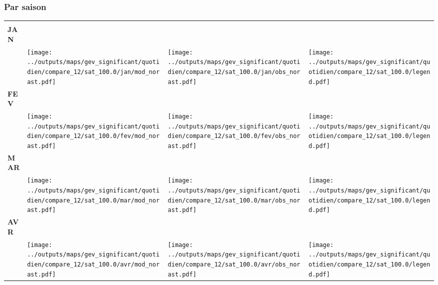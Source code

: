 \documentclass[
  letterpaper,
  DIV=11,
  numbers=noendperiod]{scrartcl}
\begin{document}
\subsubsection{Par saison}\label{par-saison-5}

\begin{longtable*}{m{2.0cm}m{7.9cm}m{7.9cm}m{1cm}}
 & \centering  & \centering  & \tabularnewline
\centering \textbf{JAN} \\[0.2em] \begin{tabular}{r@{\hspace{0.2em}}l}\end{tabular} & \centering \texttt{[image: ../outputs/maps/gev\_significant/quotidien/compare\_12/sat\_100.0/jan/mod\_norast.pdf]} & \centering \texttt{[image: ../outputs/maps/gev\_significant/quotidien/compare\_12/sat\_100.0/jan/obs\_norast.pdf]} & \centering \texttt{[image: ../outputs/maps/gev\_significant/quotidien/compare\_12/sat\_100.0/legend.pdf]} \tabularnewline
\centering \textbf{FEV} \\[0.2em] \begin{tabular}{r@{\hspace{0.2em}}l}\end{tabular} & \centering \texttt{[image: ../outputs/maps/gev\_significant/quotidien/compare\_12/sat\_100.0/fev/mod\_norast.pdf]} & \centering \texttt{[image: ../outputs/maps/gev\_significant/quotidien/compare\_12/sat\_100.0/fev/obs\_norast.pdf]} & \centering \texttt{[image: ../outputs/maps/gev\_significant/quotidien/compare\_12/sat\_100.0/legend.pdf]} \tabularnewline
\centering \textbf{MAR} \\[0.2em] \begin{tabular}{r@{\hspace{0.2em}}l}\end{tabular} & \centering \texttt{[image: ../outputs/maps/gev\_significant/quotidien/compare\_12/sat\_100.0/mar/mod\_norast.pdf]} & \centering \texttt{[image: ../outputs/maps/gev\_significant/quotidien/compare\_12/sat\_100.0/mar/obs\_norast.pdf]} & \centering \texttt{[image: ../outputs/maps/gev\_significant/quotidien/compare\_12/sat\_100.0/legend.pdf]} \tabularnewline
\centering \textbf{AVR} \\[0.2em] \begin{tabular}{r@{\hspace{0.2em}}l}\end{tabular} & \centering \texttt{[image: ../outputs/maps/gev\_significant/quotidien/compare\_12/sat\_100.0/avr/mod\_norast.pdf]} & \centering \texttt{[image: ../outputs/maps/gev\_significant/quotidien/compare\_12/sat\_100.0/avr/obs\_norast.pdf]} & \centering \texttt{[image: ../outputs/maps/gev\_significant/quotidien/compare\_12/sat\_100.0/legend.pdf]} \tabularnewline

\end{longtable*}
\end{document}
